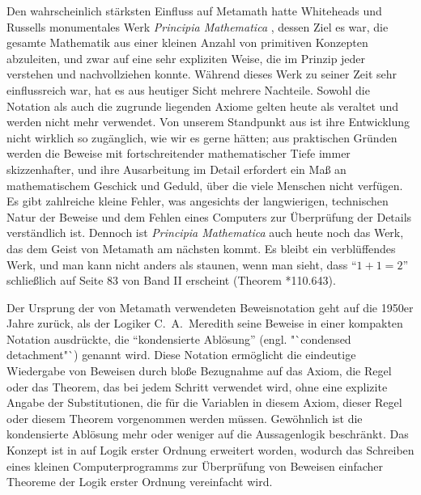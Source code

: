Den wahrscheinlich stärksten Einfluss auf Metamath hatte Whiteheads und Russells monumentales Werk {\em Principia Mathematica} \cite{PM}, dessen Ziel es war, die gesamte Mathematik aus einer kleinen Anzahl von primitiven Konzepten abzuleiten, und zwar auf eine sehr expliziten Weise, die im Prinzip jeder verstehen und nachvollziehen konnte.  Während dieses Werk zu seiner Zeit sehr einflussreich war, hat es aus heutiger Sicht mehrere Nachteile.  Sowohl die Notation als auch die zugrunde liegenden Axiome gelten heute als veraltet und werden nicht mehr verwendet.  Von unserem Standpunkt aus ist ihre Entwicklung nicht wirklich so zugänglich, wie wir es gerne hätten; aus praktischen Gründen werden die Beweise mit fortschreitender mathematischer Tiefe immer skizzenhafter, und ihre Ausarbeitung im Detail erfordert ein Maß an mathematischem Geschick und Geduld, über die viele Menschen nicht verfügen.  Es gibt zahlreiche kleine Fehler, was angesichts der langwierigen, technischen Natur der Beweise und dem Fehlen eines Computers zur Überprüfung der Details verständlich ist.
Dennoch ist {\em Principia Mathematica} auch heute noch das Werk, das dem Geist von Metamath am nächsten kommt.  Es bleibt ein verblüffendes Werk, und man kann nicht anders als staunen, wenn man sieht, dass "`$1+1=2$"' schließlich auf Seite 83 von Band II erscheint (Theorem *110.643).

Der Ursprung der von Metamath verwendeten Beweisnotation geht auf die 1950er Jahre zurück, als der Logiker C.~A.~Meredith seine Beweise in einer kompakten Notation ausdrückte, die "`kondensierte Ablösung"' (engl. "`condensed detachment"`)
\cite{Hindley} \cite{Kalman}
\cite{Meredith} \cite{Peterson} genannt wird.  Diese Notation ermöglicht die eindeutige Wiedergabe von Beweisen durch bloße Bezugnahme auf das Axiom, die Regel oder das Theorem, das bei jedem Schritt verwendet wird, ohne eine explizite Angabe der Substitutionen, die für die Variablen in diesem Axiom, dieser Regel oder diesem Theorem vorgenommen werden müssen.  Gewöhnlich ist die kondensierte Ablösung mehr oder weniger auf die Aussagenlogik beschränkt.  Das Konzept ist in \cite{Megill} auf Logik erster Ordnung erweitert worden, wodurch das Schreiben eines kleinen Computerprogramms zur Überprüfung von Beweisen einfacher Theoreme der Logik erster Ordnung vereinfacht wird.

